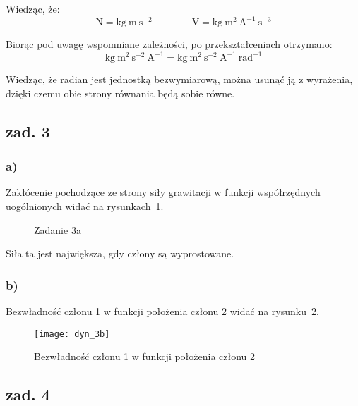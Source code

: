 \documentclass[11pt, a4paper]{article}
\begin{document}
Wiedząc, że:
\begin{equation*}
\text{N} = \text{kg} \ \text{m} \ \text{s}^{-2} \qquad\qquad
\text{V} = \text{kg} \ \text{m}^2 \ \text{A}^{-1} \ \text{s}^{-3}
\end{equation*}

Biorąc pod uwagę wspomniane zależności, po przekształceniach otrzymano:
\begin{equation*}
\text{kg} \ \text{m}^2 \ \text{s}^{-2} \ \text{A}^{-1} = 
\text{kg} \ \text{m}^2 \ \text{s}^{-2} \ \text{A}^{-1} \ \text{rad}^{-1}
\end{equation*}

Wiedząc, że radian jest jednostką bezwymiarową, można usunąć ją z wyrażenia, dzięki czemu obie strony równania będą sobie równe.

\subsection*{zad. 3}

\subsubsection*{a)}

Zakłócenie pochodzące ze strony siły grawitacji w funkcji współrzędnych uogólnionych widać na rysunkach~\ref{fig:dyn_3a}.
\begin{figure}[htbp!]
	\centering
	
	\hfill%
	
	\caption{Zadanie 3a \label{fig:dyn_3a}}
\end{figure}

Siła ta jest największa, gdy człony są wyprostowane.

\subsubsection*{b)}

Bezwładność członu 1 w funkcji położenia członu 2 widać na rysunku~\ref{fig:dyn_3b}.

\begin{figure}[htbp!]
	\centering
	\texttt{[image: dyn\_3b]}
	\caption{Bezwładność członu 1 w funkcji położenia członu 2 \label{fig:dyn_3b}}
\end{figure}

\subsection*{zad. 4}
\end{document}
